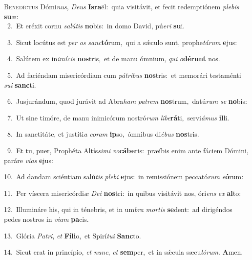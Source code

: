 \lettrine{\initial\textcolor{\initialcolor}{B}}{enedíctus} Dómi\-\textit{nus}\-, \textit{De}\-\textit{us} \textbf{Is}\-\textbf{ra}ël:~\star quia visitávit, et fecit redemptiónem \textit{ple}\-\textit{bis} \textbf{su}\-æ:\\
{\numbfont\textcolor{\numbcolor}{~2.}}~Et eréxit cornu \textit{sa}\-\textit{lú}\textit{tis} \textbf{no}\-bis:~\star in domo David, pú\-\textit{e}\-\textit{ri} \textbf{su}\-i.\par
{\numbfont\textcolor{\numbcolor}{~3.}}~Sicut locútus est \textit{per} \textit{os} \textit{sanc}\-\textbf{tó}rum,~\star qui a sǽculo sunt, prophe\-\textit{tá}\-\textit{rum} \textbf{e}\-jus:\par
{\numbfont\textcolor{\numbcolor}{~4.}}~Salútem ex in\-\textit{i}\-\textit{mí}\textit{cis} \textbf{nos}\-tris,~\star et de manu ómnium, \textit{qui} \textit{o}\-\textbf{dé}\textbf{runt} nos.\par
{\numbfont\textcolor{\numbcolor}{~5.}}~Ad faciéndam misericórdiam cum \textit{pá}\-\textit{tri}\textit{bus} \textbf{nos}\-tris:~\star et memorári testaménti \textit{su}\-\textit{i} \textbf{sanc}\-ti.\par
{\numbfont\textcolor{\numbcolor}{~6.}}~Jusjurándum, quod jurávit ad Abra\textit{ham} \textit{pa}\-\textit{trem} \textbf{nos}\-trum,~\star datú\textit{rum} \textit{se} \textbf{no}\-bis:\par
{\numbfont\textcolor{\numbcolor}{~7.}}~Ut sine timóre, de manu inimicórum nostró\textit{rum} \textit{li}\-\textit{be}\textbf{rá}ti,~\star servi\-\textit{á}\-\textit{mus} \textbf{il}\-li.\par
{\numbfont\textcolor{\numbcolor}{~8.}}~In sanctitáte, et justíti\textit{a} \textit{co}\-\textit{ram} \textbf{ip}\-so,~\star ómnibus di\-\textit{é}\-\textit{bus} \textbf{nos}\-tris.\par
{\numbfont\textcolor{\numbcolor}{~9.}}~Et tu, puer, Prophéta Altís\-\textit{si}\-\textit{mi} \textit{vo}\-\textbf{cá}\textbf{be}ris:~\star præíbis enim ante fáciem Dómini, paráre \textit{vi}\-\textit{as} \textbf{e}\-jus:\par
{\numbfont\textcolor{\numbcolor}{10.}}~Ad dandam sciéntiam salú\textit{tis} \textit{ple}\-\textit{bi} \textbf{e}\-jus:~\star in remissiónem peccató\textit{rum} \textit{e}\-\textbf{ó}rum:\par
{\numbfont\textcolor{\numbcolor}{11.}}~Per víscera misericórdi\textit{æ} \textit{De}\-\textit{i} \textbf{nos}\-tri:~\star in quibus visitávit nos, óri\textit{ens} \textit{ex} \textbf{al}\-to:\par
{\numbfont\textcolor{\numbcolor}{12.}}~Illumináre his, qui in ténebris, et in um\textit{bra} \textit{mor}\-\textit{tis} \textbf{se}\-dent:~\star ad dirigéndos pedes nostros in \textit{vi}\-\textit{am} \textbf{pa}\-cis.\par
{\numbfont\textcolor{\numbcolor}{13.}}~Glória \textit{Pa}\-\textit{tri}, \textit{et} \textbf{Fí}\-\textbf{li}o,~\star et Spirí\-\textit{tu}\-\textit{i} \textbf{Sanc}\-to.\par
{\numbfont\textcolor{\numbcolor}{14.}}~Sicut erat in princípio, \textit{et} \textit{nunc}\-, \textit{et} \textbf{sem}\-per,~\star et in sǽcula sæcu\-\textit{ló}\-\textit{rum}. \textbf{A}\-men.\par
